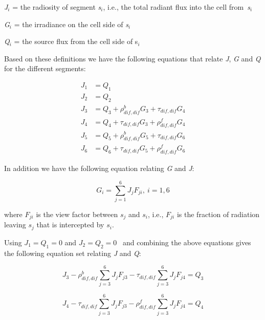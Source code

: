 \emph{J\(_{i}\)} = the radiosity of segment \emph{s\(_{i}\)}, i.e., the total radiant flux into the cell from~\emph{s\(_{i}\)}

\emph{G\(_{i}\)} = the irradiance on the cell side of \emph{s\(_{i}\)}

\emph{Q\(_{i}\)} = the source flux from the cell side of s\emph{\(_{i}\)}

Based on these definitions we have the following equations that relate \emph{J}, \emph{G} and \emph{Q} for the different segments:

\begin{equation}
  \begin{array}{rl}
    J_1 & = Q_1 \\
    J_2 & = Q_2 \\
    J_3 & = Q_3 + \rho_{dif,dif}^b G_3 + \tau_{dif,dif} G_4 \\
    J_4 & = Q_4 + \tau_{dif,dif} G_3 + \rho_{dif,dif}^f G_4 \\
    J_5 & = Q_5 + \rho_{dif,dif}^b G_5 + \tau_{dif,dif} G_6 \\
    J_6 & = Q_6 + \tau_{dif,dif} G_5 + \rho_{dif,dif}^f G_6
  \end{array}
\end{equation}

In addition we have the following equation relating \emph{G} and \emph{J}:

\begin{equation}
{G_i} = \sum\limits_{j = 1}^6 {{J_j}{F_{ji}}{\mathrm{ ,    }}~i = 1,6}
\end{equation}

where \({F_{ji}}\) is the view factor between \({s_j}\) and \({s_i}\), i.e., \({F_{ji}}\) is the fraction of radiation leaving \({s_j}\) that is intercepted by \({s_i}\).

Using \({J_1} = {Q_1} = 0\) and \({J_2} = {Q_2} = 0\) ~and combining the above equations gives the following equation set relating \emph{J} and \emph{Q}:

\begin{equation}
{J_3} - \rho_{dif,dif}^b\sum\limits_{j = 3}^6 {{J_j}{F_{j3}} - {\tau_{dif,dif}}\sum\limits_{j = 3}^6 {{J_j}{F_{j4}} = {Q_3}} }
\end{equation}

\begin{equation}
{J_4} - \tau_{dif,dif}^{}\sum\limits_{j = 3}^6 {{J_j}{F_{j3}} - \rho_{dif,dif}^f\sum\limits_{j = 3}^6 {{J_j}{F_{j4}} = {Q_4}} }
\end{equation}

